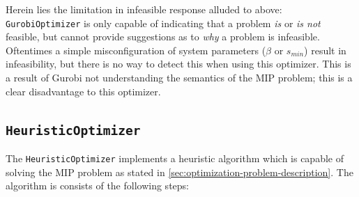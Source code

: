 \documentclass[../mthe-493-final-project.tex]{subfiles}
\begin{document}
    Herein lies the limitation in infeasible response alluded to above: \texttt{GurobiOptimizer} is only capable of indicating that a problem \textit{is} or \textit{is not} feasible, but cannot provide suggestions as to \textit{why} a problem is infeasible. Oftentimes a simple misconfiguration of system parameters ($\beta$ or $s_{min}$) result in infeasibility, but there is no way to detect this when using this optimizer. This is a result of Gurobi not understanding the semantics of the MIP problem; this is a clear disadvantage to this optimizer.
    
    \subsection{\texttt{HeuristicOptimizer}}
    \label{ssec:optimization-heuristic-optimizer-implementation}
    
    The \texttt{HeuristicOptimizer} implements a heuristic algorithm which is capable of solving the MIP problem as stated in \autoref{sec:optimization-problem-description}. The algorithm is consists of the following steps:
    
\end{document}
